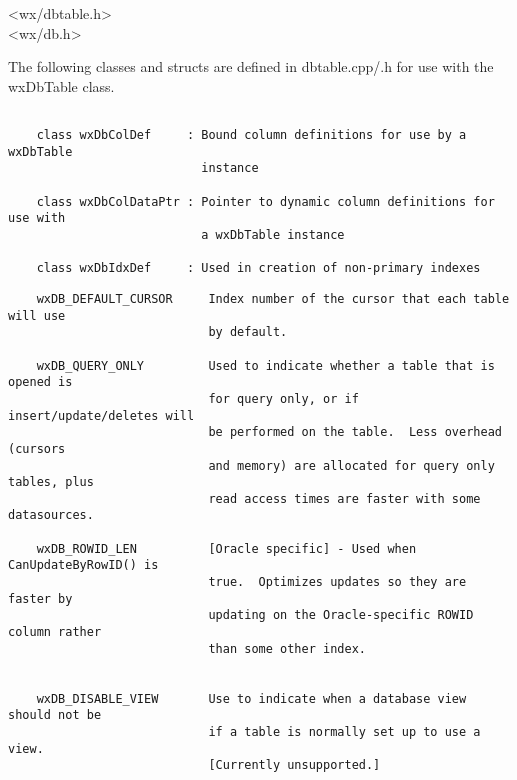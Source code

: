 
<wx/dbtable.h>\\
<wx/db.h>


The following classes and structs are defined in dbtable.cpp/.h for use with the wxDbTable class.
\begin{verbatim}

    class wxDbColDef     : Bound column definitions for use by a wxDbTable 
                           instance

    class wxDbColDataPtr : Pointer to dynamic column definitions for use with
                           a wxDbTable instance

    class wxDbIdxDef     : Used in creation of non-primary indexes

\end{verbatim}

\begin{verbatim}
    wxDB_DEFAULT_CURSOR     Index number of the cursor that each table will use
                            by default.

    wxDB_QUERY_ONLY         Used to indicate whether a table that is opened is
                            for query only, or if insert/update/deletes will
                            be performed on the table.  Less overhead (cursors
                            and memory) are allocated for query only tables, plus
                            read access times are faster with some datasources.

    wxDB_ROWID_LEN          [Oracle specific] - Used when CanUpdateByRowID() is
                            true.  Optimizes updates so they are faster by 
                            updating on the Oracle-specific ROWID column rather 
                            than some other index.


    wxDB_DISABLE_VIEW       Use to indicate when a database view should not be
                            if a table is normally set up to use a view.  
                            [Currently unsupported.]

\end{verbatim}






